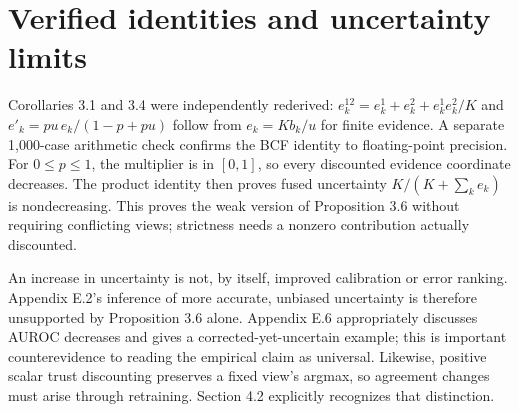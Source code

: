 \documentclass[10pt]{article}
\begin{document}
\section*{Verified identities and uncertainty limits}
Corollaries 3.1 and 3.4 were independently rederived: \(e_k^{12}=e_k^1+e_k^2+e_k^1e_k^2/K\) and \(e'_k=pu\,e_k/(1-p+pu)\) follow from \(e_k=Kb_k/u\) for finite evidence. A separate 1,000-case arithmetic check confirms the BCF identity to floating-point precision. For \(0\leq p\leq1\), the multiplier is in \([0,1]\), so every discounted evidence coordinate decreases. The product identity then proves fused uncertainty \(K/(K+\sum_k e_k)\) is nondecreasing. This proves the weak version of Proposition 3.6 without requiring conflicting views; strictness needs a nonzero contribution actually discounted.\par
An increase in uncertainty is not, by itself, improved calibration or error ranking. Appendix E.2’s inference of more accurate, unbiased uncertainty is therefore unsupported by Proposition 3.6 alone. Appendix E.6 appropriately discusses AUROC decreases and gives a corrected-yet-uncertain example; this is important counterevidence to reading the empirical claim as universal. Likewise, positive scalar trust discounting preserves a fixed view’s argmax, so agreement changes must arise through retraining. Section 4.2 explicitly recognizes that distinction.\par
\end{document}

